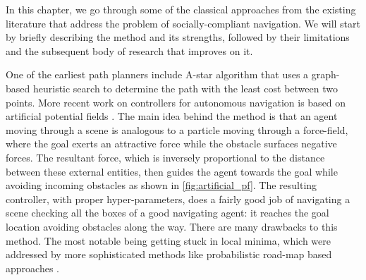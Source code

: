 In this chapter, we go through some of the classical approaches from the existing literature that address the problem of socially-compliant navigation. We will start by briefly describing the method and its strengths, followed by their limitations and the subsequent body of research that improves on it.
\par
One of the earliest path planners include A-star algorithm \cite{hart1968} that uses a graph-based heuristic search to determine the path with the least cost between two points. More recent work on controllers for autonomous navigation is based on artificial potential fields \cite{khatib_1986}. The main idea behind the method is that an agent moving through a scene is analogous to a particle moving through a force-field, where the goal exerts an attractive force while the obstacle surfaces negative forces. The resultant force, which is inversely proportional to the distance between these external entities, then guides the agent towards the goal while avoiding incoming obstacles as shown in \autoref{fig:artificial_pf}. The resulting controller, with proper hyper-parameters, does a fairly good job of navigating a scene checking all the boxes of a good navigating agent: it reaches the goal location avoiding obstacles along the way. There are many drawbacks to this method. The most notable being getting stuck in local minima, which were addressed by more sophisticated methods like probabilistic road-map based approaches \cite{Lavalle98rrt}. \\
